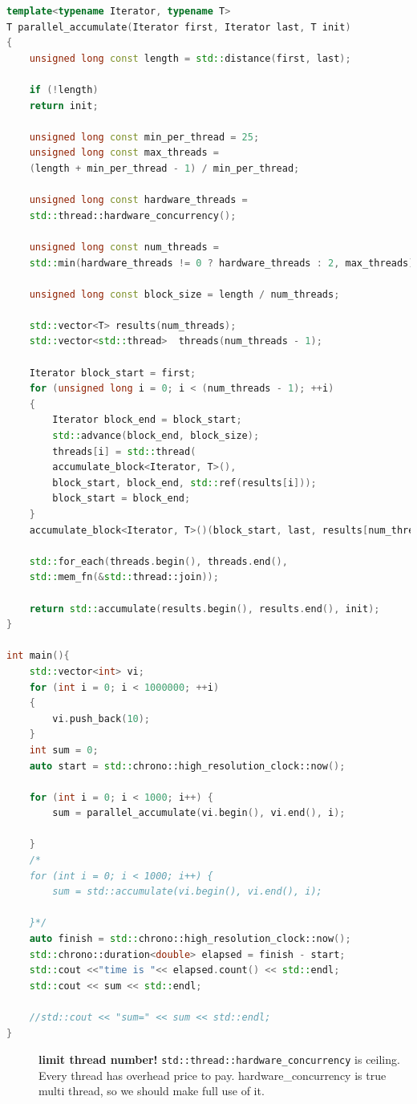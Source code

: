 \documentclass[a4paper,11pt,twoside]{book}
\begin{document}
\begin{itemize}
\begin{lstlisting}[frame=single, language=c++]
template<typename Iterator, typename T>
T parallel_accumulate(Iterator first, Iterator last, T init)
{
	unsigned long const length = std::distance(first, last);
	
	if (!length)
	return init;
	
	unsigned long const min_per_thread = 25;
	unsigned long const max_threads =
	(length + min_per_thread - 1) / min_per_thread;
	
	unsigned long const hardware_threads =
	std::thread::hardware_concurrency();
	
	unsigned long const num_threads =
	std::min(hardware_threads != 0 ? hardware_threads : 2, max_threads);
	
	unsigned long const block_size = length / num_threads;
	
	std::vector<T> results(num_threads);
	std::vector<std::thread>  threads(num_threads - 1);
	
	Iterator block_start = first;
	for (unsigned long i = 0; i < (num_threads - 1); ++i)
	{
		Iterator block_end = block_start;
		std::advance(block_end, block_size);
		threads[i] = std::thread(
		accumulate_block<Iterator, T>(),
		block_start, block_end, std::ref(results[i]));
		block_start = block_end;
	}
	accumulate_block<Iterator, T>()(block_start, last, results[num_threads - 1]);
	
	std::for_each(threads.begin(), threads.end(),
	std::mem_fn(&std::thread::join));
	
	return std::accumulate(results.begin(), results.end(), init);
}

int main(){
	std::vector<int> vi;
	for (int i = 0; i < 1000000; ++i)
	{
		vi.push_back(10);
	}
	int sum = 0;
	auto start = std::chrono::high_resolution_clock::now();
	
	for (int i = 0; i < 1000; i++) {
		sum = parallel_accumulate(vi.begin(), vi.end(), i);
		
	}
	/*
	for (int i = 0; i < 1000; i++) {
		sum = std::accumulate(vi.begin(), vi.end(), i);
		
	}*/
	auto finish = std::chrono::high_resolution_clock::now();
	std::chrono::duration<double> elapsed = finish - start;
	std::cout <<"time is "<< elapsed.count() << std::endl;
	std::cout << sum << std::endl;
	
	//std::cout << "sum=" << sum << std::endl;
}	
\end{lstlisting}	
	\begin{description}
		\item[] \textbf{limit thread number!} \texttt{std::thread::hardware\_concurrency} is ceiling. Every thread has overhead price to pay. hardware\_concurrency is true multi thread, so we should make full use of it. 
	\end{description}
	
	\end{itemize}
\end{document}
